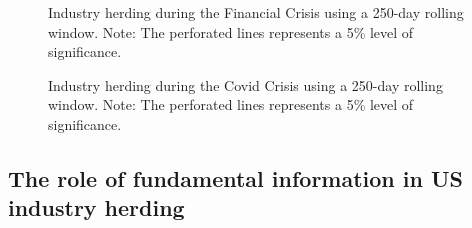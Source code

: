 \documentclass[
  letterpaper,
  DIV=11,
  numbers=noendperiod]{scrartcl}
\begin{document}
\begin{figure}[H]


\caption{\label{fig-rol_crisis_fc}Industry herding during the Financial
Crisis using a 250-day rolling window. Note: The perforated lines
represents a 5\% level of significance.}

\end{figure}%

\begin{figure}[H]


\caption{\label{fig-rol_crisis_cv}Industry herding during the Covid
Crisis using a 250-day rolling window. Note: The perforated lines
represents a 5\% level of significance.}

\end{figure}%

\subsection{The role of fundamental information in US industry
herding}\label{the-role-of-fundamental-information-in-us-industry-herding}
\end{document}
